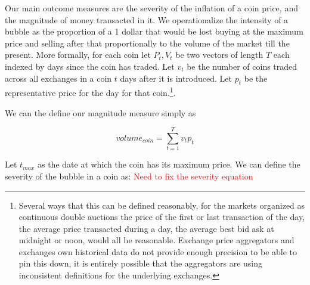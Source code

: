 Our main outcome measures are the severity of the inflation of a coin price, and the magnitude of money transacted in it.
We operationalize the intensity of a bubble as the proportion of a 1 dollar that would be lost buying at the maximum price and selling after that proportionally to the volume of the market till the present.
More formally, for each coin let $P_t,V_t$ be two vectors of length $T$ each indexed by days since the coin has traded.
Let $v_t$ be the number of coins traded across all exchanges in a coin $t$ days after it is introduced. 
Let $p_t$ be the representative price for the day for that coin.\footnote{ Several ways that this can be defined reasonably, for the markets organized as continuous double auctions the price of the first or last transaction of the day,  the average price transacted during a day, the average best bid ask at midnight or noon, would all be reasonable. Exchange price aggregators and exchanges own historical data do not provide enough precision to be able to pin this down, it is entirely possible that the aggregators are using inconsistent definitions for the underlying exchanges.   }. 

We can the define our magnitude measure simply as

\begin{equation}
volume_{coin} = \sum_{t=1}^{T} v_t  p_t
\end{equation}

Let $t_{max}$ as the date at which the coin has its maximum price.  
We can define the severity of the bubble in a coin as: \textcolor{red}{Need to fix the severity equation}
